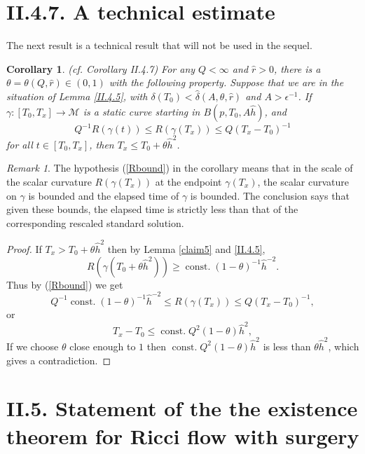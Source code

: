 \documentclass[12pt]{amsart}
\newcommand{\const}{\operatorname{const.}}
\newcommand{\M}{{\mathcal M}}
\renewcommand{\th}{\theta}
\newcommand{\eps}{\epsilon}
\newcommand{\ga}{\gamma}
\newcommand{\ra}{\rightarrow}
\numberwithin{equation}{section}
\theoremstyle{plain}
\newtheorem{corollary}[equation]{Corollary}
\theoremstyle{definition}
\theoremstyle{remark}
\newtheorem{remark}[equation]{Remark}
\begin{document}
\section{II.4.7. A technical estimate}

The next result is a technical result that will not be used in the sequel.

\begin{corollary}(cf. Corollary II.4.7)
For any $Q<\infty$ and $\hat r>0$, there is a $\th=\th(Q,\hat r)\in (0,1)$
with the following property.  Suppose that we are in the situation of
Lemma \ref{II.4.5}, with
$\delta(T_0) < \hat{\delta}(A, \th, \hat r)$
and $A>\eps^{-1}$.  If $\ga:[T_0,T_x]\ra \M$ is a static curve
starting in $B(p,T_0,A\hat h)$, and 
\begin{equation}
\label{Rbound}
Q^{-1}R(\ga(t))\leq R(\ga(T_x))\leq Q(T_x-T_0)^{-1}
\end{equation}
for all $t\in [T_0,T_x]$,  then $T_x\leq T_0+\th\hat h^2$.
\end{corollary}
\begin{remark}
The hypothesis (\ref{Rbound}) in the corollary means
that in the scale of the scalar curvature $R(\gamma(T_x))$ at the
endpoint $\gamma(T_x)$, the scalar curvature on $\gamma$ is bounded
and the elapsed time of $\gamma$ is bounded. The conclusion says that
given these bounds, the elapsed time is strictly less than that of
the corresponding rescaled standard solution.
\end{remark}
\begin{proof}
If $T_x>T_0+\th\hat h^2$ then by Lemma \ref{claim5} and \ref{II.4.5},
\begin{equation}
R(\ga(T_0+\th\hat h^2))\ge \const(1-\th)^{-1}\hat h^{-2}.
\end{equation}
Thus by (\ref{Rbound}) we get
\begin{equation}
Q^{-1}\const (1-\th)^{-1}\hat h^{-2}\leq R(\ga(T_x))\leq Q(T_x-T_0)^{-1},
\end{equation}
or
\begin{equation}
T_x-T_0\leq \const Q^2(1-\th)\hat h^2,
\end{equation}
If we choose $\th$ close enough to $1$ then $\const Q^2(1-\th)\hat h^2$ is less than
$\th\hat h^2$, which gives a contradiction.
\end{proof}


\section{II.5. Statement of the 
the existence theorem for
 Ricci flow with surgery} \label{II.5}
\end{document}
